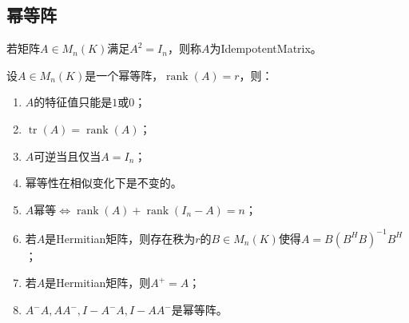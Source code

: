 \subsection{幂等阵}
\begin{definition}
	若矩阵$A\in M_{n}(K)$满足$A^2=I_n$，则称$A$为\gls{IdempotentMatrix}。
\end{definition}
\begin{property}\label{prop:IdempotentMat}
	设$A\in M_{n}(K)$是一个幂等阵，$\operatorname{rank}(A)=r$，则：
	\begin{enumerate}
		\item $A$的特征值只能是$1$或$0$；
		\item $\operatorname{tr}(A)=\operatorname{rank}(A)$；
		\item $A$可逆当且仅当$A=I_n$；
		\item 幂等性在相似变化下是不变的。
		\item $A\text{幂等}\iff\operatorname{rank}(A)+\operatorname{rank}(I_n-A)=n$；
		\item 若$A$是Hermitian矩阵，则存在秩为$r$的$B\in M_{n}(K)$使得$A=B(B^HB)^{-1}B^H$；
		\item 若$A$是Hermitian矩阵，则$A^+=A$；
		\item $A^-A,AA^-,I-A^-A,I-AA^-$是幂等阵。
	\end{enumerate}
\end{property}
